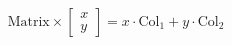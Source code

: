 \documentclass[preview]{standalone}
\begin{document}
\begin{align*}
\text{Matrix} \times \begin{bmatrix} x \\ y \end{bmatrix} = x \cdot \text{Col}_1 + y \cdot \text{Col}_2
\end{align*}
\end{document}
